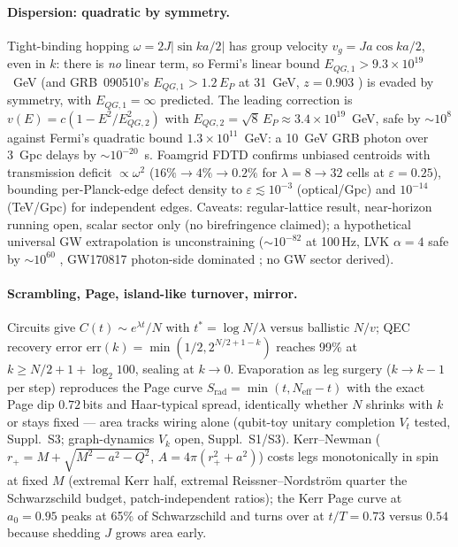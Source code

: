 \documentclass[11pt]{article}
\begin{document}
\paragraph{Dispersion: quadratic by symmetry.}
Tight-binding hopping $\omega = 2J|\sin ka/2|$ has group velocity
$v_g = Ja\cos ka/2$, even in $k$: there is \emph{no} linear term, so Fermi's
linear bound $E_{QG,1} > 9.3\times 10^{19}$~GeV (and GRB~090510's
$E_{QG,1} > 1.2\,E_P$ at 31~GeV, $z = 0.903$ \cite{Abdo2009}) is evaded by
symmetry, with $E_{QG,1} = \infty$ predicted. The leading correction is
$v(E) = c(1 - E^2/E_{QG,2}^2)$ with
$E_{QG,2} = \sqrt{8}\,E_P \approx 3.4\times 10^{19}$~GeV, safe by
$\sim 10^8$ against Fermi's quadratic bound $1.3\times 10^{11}$~GeV: a
10~GeV GRB photon over 3~Gpc delays by $\sim 10^{-20}$~s. Foamgrid FDTD
confirms unbiased centroids with transmission deficit $\propto \omega^2$
($16\% \to 4\% \to 0.2\%$ for $\lambda = 8 \to 32$ cells at
$\varepsilon = 0.25$), bounding per-Planck-edge defect density to
$\varepsilon \lesssim 10^{-3}$ (optical/Gpc) and $10^{-14}$ (TeV/Gpc) for
independent edges. Caveats: regular-lattice result, near-horizon running
open, scalar sector only (no birefringence claimed); a hypothetical
universal GW extrapolation is unconstraining ($\sim 10^{-82}$ at 100\,Hz,
LVK $\alpha = 4$ safe by $\sim 10^{60}$ \cite{TestGR}, GW170817
photon-side dominated \cite{Abbott2017}; no GW sector derived).

\paragraph{Scrambling, Page, island-like turnover, mirror.}
Circuits give $C(t) \sim e^{\lambda t}/N$ with $t^* = \log N/\lambda$ versus
ballistic $N/v$; QEC recovery error
$\mathrm{err}(k) = \min(1/2, 2^{N/2+1-k})$ reaches 99\% at
$k \ge N/2+1+\log_2 100$, sealing at $k \to 0$. Evaporation as leg surgery
($k \to k-1$ per step) reproduces the Page curve
$S_{\mathrm{rad}} = \min(t, N_{\mathrm{eff}}-t)$ with the exact Page dip
$0.72$\,bits and Haar-typical spread, identically whether $N$ shrinks with
$k$ or stays fixed --- area tracks wiring alone (qubit-toy unitary completion $V_t$ tested,
Suppl.~S3; graph-dynamics $V_k$ open, Suppl.~S1/S3). Kerr--Newman
($r_+ = M+\sqrt{M^2-a^2-Q^2}$, $A = 4\pi(r_+^2+a^2)$) costs legs monotonically
in spin at fixed $M$ (extremal Kerr half, extremal Reissner--Nordstr\"om
quarter the Schwarzschild budget, patch-independent ratios); the Kerr Page
curve at $a_0 = 0.95$ peaks at 65\% of Schwarzschild and turns over at
$t/T = 0.73$ versus $0.54$ because shedding $J$ grows area early.
\end{document}
